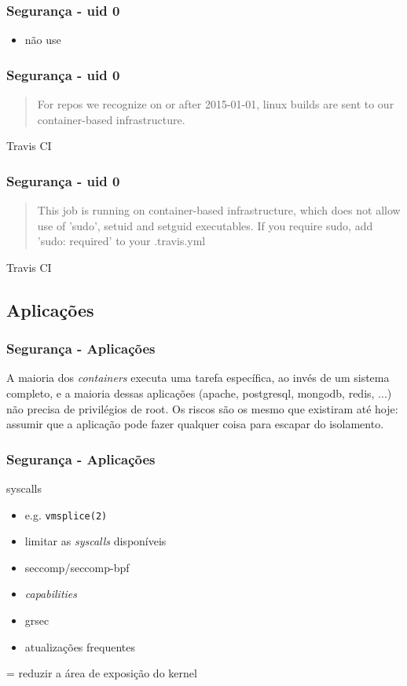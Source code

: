 \documentclass{beamer}
\begin{document}
\begin{frame}
    \frametitle{Segurança - uid 0}
    \begin{itemize}
        \item não use
    \end{itemize}
\end{frame}

\begin{frame}
    \frametitle{Segurança - uid 0}
    \begin{quote}
        For repos we recognize on or after 2015-01-01, linux builds are sent to
        our container-based infrastructure.
    \end{quote}
    Travis CI
\end{frame}

\begin{frame}
    \frametitle{Segurança - uid 0}
    \begin{quote}
        This job is running on container-based infrastructure, which does not
        allow use of 'sudo', setuid and setguid executables.  If you require
        sudo, add 'sudo: required' to your .travis.yml
    \end{quote}
    Travis CI
\end{frame}

\subsection{Aplicações}

\begin{frame}
    \frametitle{Segurança - Aplicações}
    A maioria dos \textit{containers} executa uma tarefa específica, ao invés
    de um sistema completo, e a maioria dessas aplicações (apache, postgresql,
    mongodb, redis, ...) não precisa de privilégios de root. Os riscos são os
    mesmo que existiram até hoje: assumir que a aplicação pode fazer qualquer
    coisa para escapar do isolamento.
\end{frame}

\begin{frame}
    \frametitle{Segurança - Aplicações}
    syscalls
    \begin{itemize}
        \item e.g. \texttt{vmsplice(2)}
        \item limitar as \textit{syscalls} disponíveis
        \item seccomp/seccomp-bpf
        \item \textit{capabilities}
        \item grsec
        \item atualizações frequentes
    \end{itemize}
    = reduzir a área de exposição do kernel
\end{frame}
\end{document}
